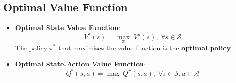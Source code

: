 \documentclass[twocolumn,landscape,10pt]{article}
\theoremstyle{definition}
\begin{document}
\subsection{Optimal Value Function}

\begin{itemize}
    \item \textbf{\underline{Optimal State Value Function}}:
        \[
            V^*(s)=\underset{\pi}{\max}\;V^\pi(s),\;\forall s\in\mathcal{S}
        \]
        The policy $\pi^*$ that maximises the value function is the
        \textbf{\underline{optimal policy}}.
    \item \textbf{\underline{Optimal State-Action Value Function}}:
        \[
            Q^*(s,a)=\underset{\pi}{\max}\,Q^\pi(s,a),\;\forall
            s\in\mathcal{S},a\in\mathcal{A}
        \]
\end{itemize}
\end{document}
